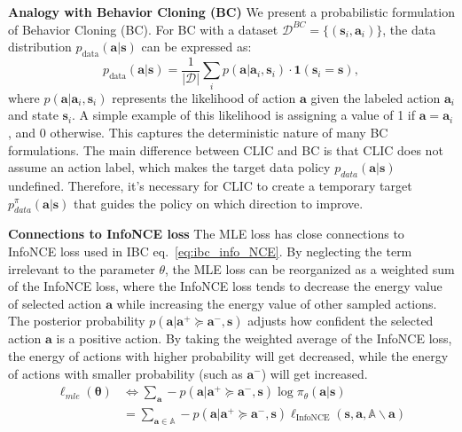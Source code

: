 \textbf{Analogy with Behavior Cloning (BC)}
We present a probabilistic formulation of Behavior Cloning (BC). For BC with a dataset \(\mathcal{D}^{BC} = \{(\bm{s}_i, \bm{a}_i)\}\), the data distribution \(p_{\text{data}}(\bm{a} | \bm{s})\) can be expressed as:
\[
p_{\text{data}}(\bm{a} | \bm{s}) = \frac{1}{|\mathcal{D}|} \sum_{i} p(\bm{a} | \bm{a}_i, \bm{s}_i) \cdot \mathbf{1}(\bm{s}_i = \bm{s}),
\]
where \(p(\bm{a} | \bm{a}_i, \bm{s}_i)\) represents the likelihood of action \(\bm{a}\) given the labeled action \(\bm{a}_i\) and state \(\bm{s}_i\). 
A simple example of this likelihood is assigning a value of 1 if \(\bm{a} = \bm{a}_i\), and 0 otherwise. This captures the deterministic nature of many BC formulations.
The main difference between CLIC and BC is that CLIC does not assume an action label, which makes the target data policy $p_{data} (\bm a | \bm s)$ undefined. 
Therefore, it's necessary for CLIC to create a temporary target $ p^{\pi}_ {data} (\bm a | \bm s)$ that guides the policy on which direction to improve.


\textbf{Connections to InfoNCE loss} The MLE loss has close connections to InfoNCE loss used in IBC eq.~\eqref{eq:ibc_info_NCE}.
By neglecting the term irrelevant to the parameter $\theta$, the MLE loss can be reorganized as a weighted sum of the InfoNCE loss, where the InfoNCE loss tends to decrease the energy value of selected action $\bm a$ while increasing the energy value of other sampled actions. 
The posterior probability $p (\bm a|\bm a^+ \succeq \bm a^-, \bm s)$ adjusts how confident the selected action  $\bm a$ is a positive action. By taking the weighted average of the InfoNCE loss, the energy of actions with higher probability will get decreased, while the energy of actions with smaller probability (such as $\bm a^-$) will get increased. 
\begin{align*}
    \ell_{mle}(\bm \theta) &\Leftrightarrow
    \sum_{\bm a } -p (\bm a|\bm a^+ \succeq \bm a^-, \bm s) \log \pi_{\theta}(\bm a | \bm s) \\
    &= \sum_{\bm a \in \mathbb A} -p (\bm a|\bm a^+ \succeq \bm a^-, \bm s) \ell_{\text{InfoNCE}}(\bm s, \bm a, \mathbb A \backslash  \bm a)
\end{align*}

